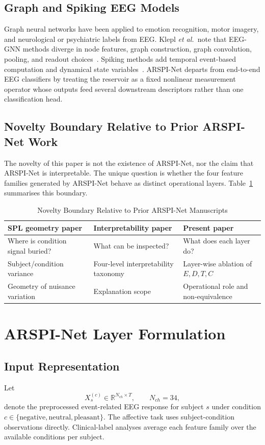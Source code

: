 \documentclass[journal]{IEEEtran}
\begin{document}
\subsection{Graph and Spiking EEG Models}
Graph neural networks have been applied to emotion recognition, motor imagery, and neurological or psychiatric labels from EEG. Klepl \emph{et al.}\ note that EEG-GNN methods diverge in node features, graph construction, graph convolution, pooling, and readout choices~\cite{klepl2024gnn}. Spiking methods add temporal event-based computation and dynamical state variables~\cite{maass2002liquid,gong2023sglnet}. ARSPI-Net departs from end-to-end EEG classifiers by treating the reservoir as a fixed nonlinear measurement operator whose outputs feed several downstream descriptors rather than one classification head.

\subsection{Novelty Boundary Relative to Prior ARSPI-Net Work}
The novelty of this paper is not the existence of ARSPI-Net, nor the claim that ARSPI-Net is interpretable. The unique question is whether the four feature families generated by ARSPI-Net behave as distinct operational layers. Table~\ref{tab:novelty_boundary} summarises this boundary.

\begin{table}[!t]
\caption{Novelty Boundary Relative to Prior ARSPI-Net Manuscripts}
\label{tab:novelty_boundary}
\centering
\footnotesize
\begin{tabular}{p{}p{}p{}}
\toprule
SPL geometry paper & Interpretability paper & Present paper \\
\midrule
Where is condition signal buried? & What can be inspected? & What does each layer do? \\
Subject/condition variance & Four-level interpretability taxonomy & Layer-wise ablation of $E,D,T,C$ \\
Geometry of nuisance variation & Explanation scope & Operational role and non-equivalence \\
\bottomrule
\end{tabular}
\end{table}

\section{ARSPI-Net Layer Formulation}
\subsection{Input Representation}
Let
\begin{equation}
X_s^{(c)} \in \mathbb{R}^{N_{ch}\times T}, \qquad N_{ch}=34,
\end{equation}
denote the preprocessed event-related EEG response for subject $s$ under condition $c\in\{\mathrm{negative},\mathrm{neutral},\mathrm{pleasant}\}$. The affective task uses subject-condition observations directly. Clinical-label analyses average each feature family over the available conditions per subject.
\end{document}
